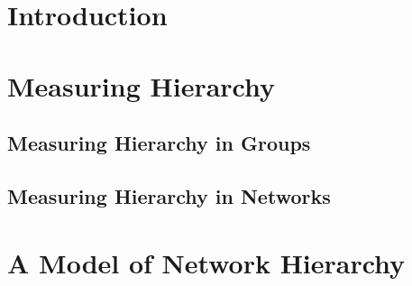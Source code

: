 \documentclass[3p,times]{elsarticle}
\begin{document}
\section{Introduction}
\label{sec:introduction}

\section{Measuring Hierarchy}

\subsection{Measuring Hierarchy in Groups}


\subsection{Measuring Hierarchy in Networks}


\section{A Model of Network Hierarchy}
\end{document}
